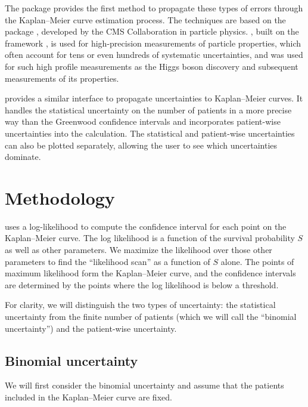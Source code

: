 \documentclass[article]{jss}
\begin{document}
The  package provides the first method to propagate these types of errors through the Kaplan--Meier curve estimation process.  The techniques are based on the  package \citep{combine}, developed by the CMS Collaboration in particle physics.  , built on the  framework \citep{RooFit}, is used for high-precision measurements of particle properties, which often account for tens or even hundreds of systematic uncertainties, and was used for such high profile measurements as the Higgs boson discovery \citep{HIG-12-028} and subsequent measurements of its properties.

 provides a similar interface to propagate uncertainties to Kaplan--Meier curves.  It handles the statistical uncertainty on the number of patients in a more precise way than the Greenwood confidence intervals and incorporates patient-wise uncertainties into the calculation.  The statistical and patient-wise uncertainties can also be plotted separately, allowing the user to see which uncertainties dominate.

\section{Methodology}

 uses a log-likelihood to compute the confidence interval for each point on the Kaplan--Meier curve.  The log likelihood is a function of the survival probability \(S\) as well as other parameters.  We maximize the likelihood over those other parameters to find the ``likelihood scan'' as a function of \(S\) alone.  The points of maximum likelihood form the Kaplan--Meier curve, and the confidence intervals are determined by the points where the log likelihood is below a threshold.

For clarity, we will distinguish the two types of uncertainty: the statistical uncertainty from the finite number of patients (which we will call the ``binomial uncertainty'') and the patient-wise uncertainty.

\subsection{Binomial uncertainty}

We will first consider the binomial uncertainty and assume that the patients included in the Kaplan--Meier curve are fixed.
\end{document}
